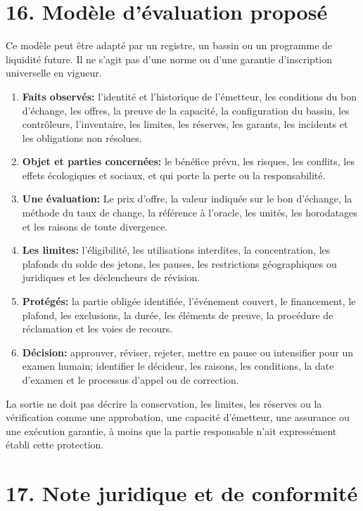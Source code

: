 \documentclass[11pt]{article}
\begin{document}
\section*{16. Modèle d'évaluation proposé}

Ce modèle peut être adapté par un registre, un bassin ou un programme de liquidité future. Il ne s'agit pas d'une norme ou d'une garantie d'inscription universelle en vigueur.

\begin{enumerate}[leftmargin=*]
\item \textbf{Faits observés:} l'identité et l'historique de l'émetteur, les conditions du bon d'échange, les offres, la preuve de la capacité, la configuration du bassin, les contrôleurs, l'inventaire, les limites, les réserves, les garants, les incidents et les obligations non résolues.
\item \textbf{Objet et parties concernées:} le bénéfice prévu, les risques, les conflits, les effets écologiques et sociaux, et qui porte la perte ou la responsabilité.
\item \textbf{Une évaluation:} Le prix d'offre, la valeur indiquée sur le bon d'échange, la méthode du taux de change, la référence à l'oracle, les unités, les horodatages et les raisons de toute divergence.
\item \textbf{Les limites:} l'éligibilité, les utilisations interdites, la concentration, les plafonds du solde des jetons, les pauses, les restrictions géographiques ou juridiques et les déclencheurs de révision.
\item \textbf{Protégés:} la partie obligée identifiée, l'événement couvert, le financement, le plafond, les exclusions, la durée, les éléments de preuve, la procédure de réclamation et les voies de recours.
\item \textbf{Décision:} approuver, réviser, rejeter, mettre en pause ou intensifier pour un examen humain; identifier le décideur, les raisons, les conditions, la date d'examen et le processus d'appel ou de correction.
\end{enumerate}
La sortie ne doit pas décrire la conservation, les limites, les réserves ou la vérification comme une approbation, une capacité d'émetteur, une assurance ou une exécution garantie, à moins que la partie responsable n'ait expressément établi cette protection.


\section*{17. Note juridique et de conformité}
\end{document}
